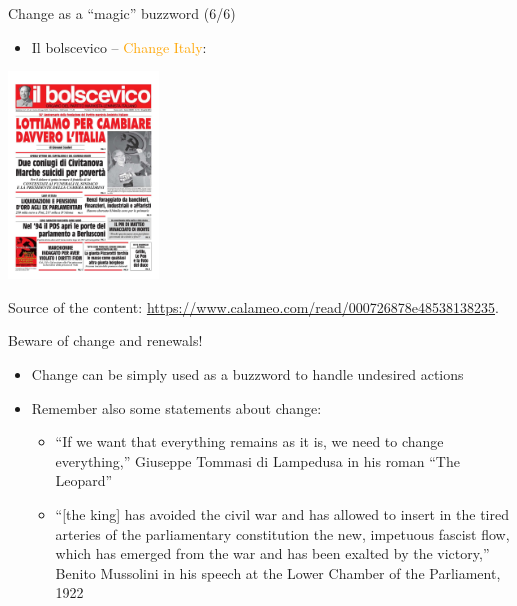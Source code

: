 \documentclass{beamer}
\begin{document}
\begin{frame}
{\centerline{Change as a ``magic'' buzzword (6/6)}}
 
\begin{itemize}
 \item Il bolscevico -- \textcolor{orange}{Change Italy}:
 \end{itemize} 
\begin{center}
 \includegraphics[width=4cm]{P2023.AIBCCSS.Change/change.IlBolscevico.jpg}
 
 \end{center}
 
\begin{center}
\tiny
Source of the content: \url{https://www.calameo.com/read/000726878e48538138235}.
\end{center}



\end{frame}




\begin{frame}
{\centerline{Beware of change and renewals!}}

\begin{itemize}
\item Change can be simply used as a buzzword to handle undesired actions
\item Remember also some statements about change:
\begin{itemize}
\item ``If we want that everything remains as it is, we need to change everything,'' Giuseppe Tommasi di Lampedusa in his roman ``The Leopard''
\item ``[the king] has avoided the civil war and has allowed to insert in the tired arteries of the parliamentary constitution the new, impetuous fascist flow, which has emerged from the war and has been exalted by the victory,'' Benito Mussolini in his speech at the Lower Chamber of the Parliament, 1922
\end{itemize} 
\end{itemize} 

\end{frame}
\end{document}
